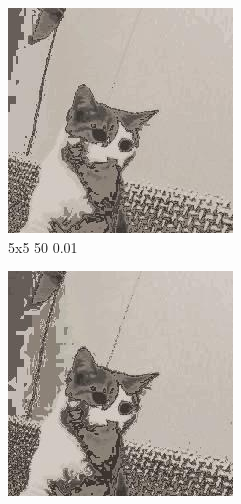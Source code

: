 \documentclass[12pt,a4paper]{article}
\begin{document}
\begin{figure}[htb]
\medskip
\begin{subfigure}{0.25\textwidth}
  \includegraphics[width=\linewidth]{images/small/5-5-50-001}
  \caption{5x5 50 0.01}
  \label{fig:4}
\end{subfigure}\hfil %
\begin{subfigure}{0.25\textwidth}
  \includegraphics[width=\linewidth]{images/small/5-5-255-05}

\end{subfigure}
\end{figure}
\end{document}
